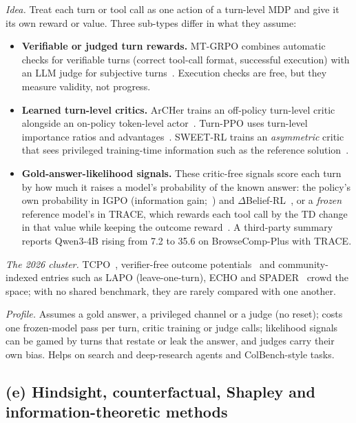 \emph{Idea.} Treat each turn or tool call as one action of a turn-level MDP and give it its own reward or value. Three sub-types differ in what they assume:
\begin{itemize}
  \item \textbf{Verifiable or judged turn rewards.} MT-GRPO combines automatic checks for verifiable turns (correct tool-call format, successful execution) with an LLM judge for subjective turns~\citep{wei2025reinforcing}\unverified. Execution checks are free, but they measure validity, not progress.
  \item \textbf{Learned turn-level critics.} ArCHer trains an off-policy turn-level critic alongside an on-policy token-level actor~\citep{zhou2024archer}\unverified. Turn-PPO uses turn-level importance ratios and advantages~\citep{turnppo2025turn}\unverified. SWEET-RL trains an \emph{asymmetric} critic that sees privileged training-time information such as the reference solution~\citep{zhou2025sweet}\unverified.
  \item \textbf{Gold-answer-likelihood signals.} These critic-free signals score each turn by how much it raises a model's probability of the known answer: the policy's own probability in IGPO (information gain;~\citealp{igpo2025information}\unverified) and $\Delta$Belief-RL~\citep{deltabelief2026intrinsic}\unverified, or a \emph{frozen} reference model's in TRACE, which rewards each tool call by the TD change in that value while keeping the outcome reward~\citep{trace2026turn}. A third-party summary reports Qwen3-4B rising from 7.2 to 35.6 on BrowseComp-Plus with TRACE\unverified.
\end{itemize}

\emph{The 2026 cluster.} TCPO~\citep{tcpo2026turn}, verifier-free outcome potentials~\citep{sop2026self} and community-indexed entries such as LAPO (leave-one-turn), ECHO and SPADER~\citep{thinkwee2026agentsmeetrl}\unverified{} crowd the space; with no shared benchmark, they are rarely compared with one another.

\emph{Profile.} Assumes a gold answer, a privileged channel or a judge (no reset); costs one frozen-model pass per turn, critic training or judge calls; likelihood signals can be gamed by turns that restate or leak the answer, and judges carry their own bias. Helps on search and deep-research agents and ColBench-style tasks.

\subsection{(e) Hindsight, counterfactual, Shapley and information-theoretic methods}\label{sec:tax-hindsight}


